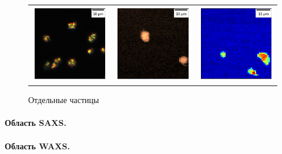 	\begin{figure}[h]
	    \centering
	    \begin{tabular}{ccc}
\includegraphics[width=0.33\linewidth]{fig/powder_optic.png}
&
\includegraphics[width=0.33\linewidth]{fig/powder_dif1.png}
&
\includegraphics[width=0.33\linewidth]{fig/powder_dif2.png}
\end{tabular}
	    \caption{Отдельные частицы}
	    \label{fig:powder}
	\end{figure}
	
	\paragraph{Область SAXS.}
	\paragraph{Область WAXS.}
	
	
	
